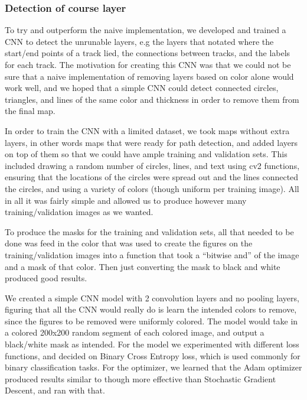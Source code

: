\documentclass[a4paper,12pt]{extarticle}
\begin{document}
\subsubsection{Detection of course layer}

To try and outperform the naive implementation, we developed and trained a CNN to detect the unrunable layers, e.g the layers that notated where the start/end points of a track lied, the connections between tracks, and the labels for each track.
The motivation for creating this CNN was that we could not be sure that a naive implementation of removing layers based on color alone would work well, and we hoped that a simple CNN could detect connected circles, triangles, and lines of the same color and thickness in order to remove them from the final map. 

In order to train the CNN with a limited dataset, we took maps without extra layers, in other words maps that were ready for path detection, and added layers on top of them so that we could have ample training and validation sets.
This included drawing a random number of circles, lines, and text using cv2 functions, ensuring that the locations of the circles were spread out and the lines connected the circles, and using a variety of colors (though uniform per training image).
All in all it was fairly simple and allowed us to produce however many training/validation images as we wanted.

To produce the masks for the training and validation sets, all that needed to be done was feed in the color that was used to create the figures on the training/validation images into a function that took a “bitwise and” of the image and a mask of that color.
Then just converting the mask to black and white produced good results.

We created a simple CNN model with 2 convolution layers and no pooling layers, figuring that all the CNN would really do is learn the intended colors to remove, since the figures to be removed were uniformly colored.
The model would take in a colored 200x200 random segment of each colored image, and output a black/white mask as intended.
For the model we experimented with different loss functions, and decided on Binary Cross Entropy loss, which is used commonly for binary classification tasks.
For the optimizer, we learned that the Adam optimizer produced results similar to though more effective than Stochastic Gradient Descent, and ran with that.
\end{document}
